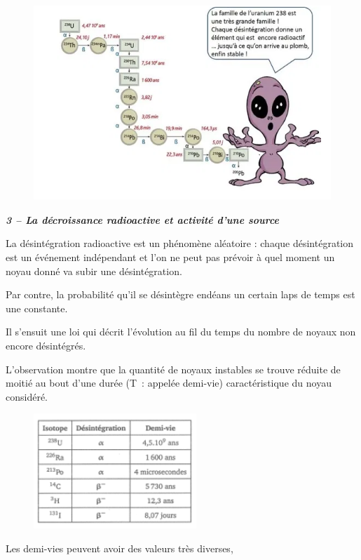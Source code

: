 \begin{figure}
\centering
\includegraphics[width=11.305cm,height=7.361cm]{Pictures/100000010000022100000163C6AFC1C203E09AFE.png}
\caption{}
\end{figure}

\emph{\textbf{3 -- La décroissance radioactive et activité d'une source
}}

La désintégration radioactive est un phénomène aléatoire : chaque
désintégration est un événement indépendant et l'on ne peut pas prévoir
à quel moment un noyau donné va subir une désintégration.

Par contre, la probabilité qu'il se désintègre endéans un certain laps
de temps est une constante.

Il s'ensuit une loi qui décrit l'évolution au fil du temps du nombre de
noyaux non encore désintégrés.

L'observation montre que la quantité de noyaux instables se trouve
réduite de moitié au bout d'une durée (T~: appelée demi-vie)
caractéristique du noyau considéré.

\begin{figure}
\centering
\includegraphics[width=6.147cm,height=4.33cm]{Pictures/10000001000000DB0000009A3ECA1A1B4D2021A5.png}
\caption{}
\end{figure}

Les demi-vies peuvent avoir des valeurs très diverses,

